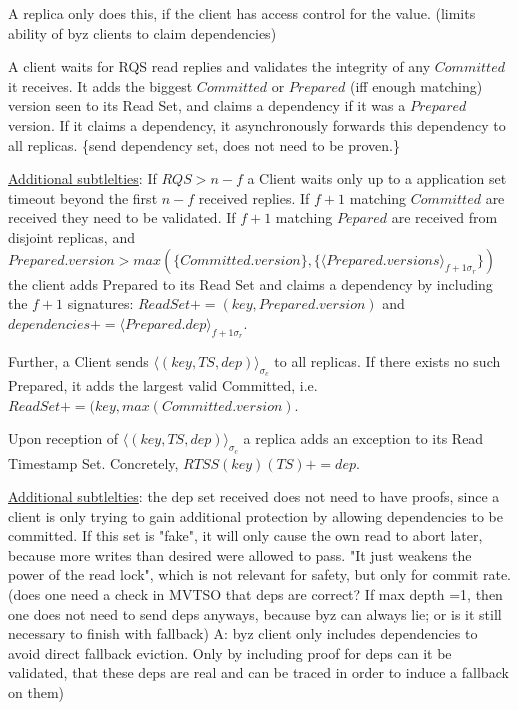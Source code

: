 \begin{enumerate}
A replica only does this, if the client has access control for the value. (limits ability of byz clients to claim dependencies)



A client waits for RQS read replies and validates the integrity of any $Committed$ it receives.  It adds the biggest $Committed$ or $Prepared$ (iff enough matching) version seen to its Read Set, and claims a dependency if it was a $Prepared$ version. If it claims a dependency, it asynchronously forwards this dependency to all replicas. 
\{send dependency set, does not need to be proven.\}


\underline{Additional subtlelties}: If $RQS > n-f$ a Client waits only up to a application set timeout beyond the first $n-f$ received replies. If $f+1$ matching $Committed$ are received they need to be validated. If $f+1$ matching $Pepared$ are received from disjoint replicas, and
 $Prepared.version > max(\{Committed.version\}, \{\langle Prepared.versions \rangle_{f+1 \sigma_r}\})$ the client adds Prepared to its Read Set and claims a dependency by including the $f+1$ signatures: $ReadSet += (key, Prepared.version)$ and $dependencies += \langle Prepared.dep \rangle_{f+1 \sigma_r}$. 

 Further, a Client sends $\langle (key, TS, dep)\rangle_{\sigma_c}$ to all replicas. If there exists no such Prepared, it adds the largest valid Committed, i.e. $ReadSet += (key, max(Committed.version)$. 



Upon reception of $\langle (key, TS, dep)\rangle_{\sigma_c}$ a replica adds an exception to its Read Timestamp Set. Concretely, $RTSS(key)(TS) += dep$.

\underline{Additional subtlelties}: the dep set received does not need to have proofs, since a client is only trying to gain additional protection by allowing dependencies to be committed. If this set is "fake", it will only cause the own read to abort later, because more writes than desired were allowed to pass. "It just weakens the power of the read lock", which is not relevant for safety, but only for commit rate.
(does one need a check in MVTSO that deps are correct? If max depth =1, then one does not need to send deps anyways, because byz can always lie; or is it still necessary to finish with fallback)
A: byz client only includes dependencies to avoid direct fallback eviction. Only by including proof for deps can it be validated, that these deps are real and can be traced in order to induce a fallback on them)




\end{enumerate}
